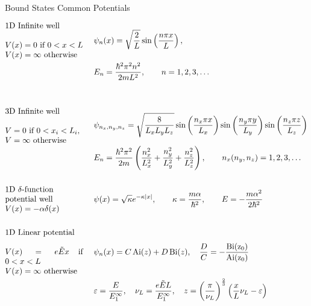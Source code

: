 \documentclass{article}[a4paper]
\begin{document}
\begin{minipage}[t]{0.5\textwidth}
  \noindent
  \begin{center}
    \large{Bound States Common Potentials}
  \end{center}
  \begin{align*}
    &\textrm{\parbox{0.28\textwidth}{1D Infinite well\\~\\ $V(x) = 0$ if $0 < x < L$\\ $V(x) = \infty$ otherwise}}    & ~&\psi_n(x) = \sqrt{\frac{2}{L}} \sin\left( \frac{n\pi x}{L} \right),\\
    && ~&E_n = \frac{\hbar^2 \pi^2 n^2}{2m L^2}, \qquad n = 1, 2, 3, \dots \\
    &&&\\
    &&&\\
    &\textrm{\parbox{0.28\textwidth}{3D Infinite well\\~\\ $V = 0$ if $0 < x_i < L_i$,\\ $V = \infty$ otherwise}} & ~&\psi_{n_x,n_y,n_z} = \sqrt{\frac{8}{L_x L_y L_z}} \sin\left( \frac{n_x\pi x}{L_x} \right) \sin\left( \frac{n_y\pi y}{L_y} \right)\sin\left( \frac{n_z\pi z}{L_z} \right)\\
    && ~&E_n = \frac{\hbar^2 \pi^2}{2m}\left( \frac{n_x^2}{L_x^2} + \frac{n_y^2}{L_y^2} + \frac{n_z^2}{L_z^2} \right), \qquad n_x(n_y, n_z) = 1, 2, 3, \dots\\
    &&&\\
    &\textrm{\parbox{0.28\textwidth}{1D $\delta$-function\\ potential well\\ $V(x) = -\alpha \delta(x)$}} & ~&\psi(x) = \sqrt{\kappa} e^{-\kappa |x|}, \qquad \kappa = \frac{m\alpha}{\hbar^2}, \qquad E = -\frac{m\alpha^2}{2\hbar^2}\\
    &&&\\
    &\textrm{\parbox{0.28\textwidth}{1D Linear potential\\~\\ $V(x) = e\tilde{E}x$ if $0 < x < L$ \\ $V(x) = \infty$ otherwise}}  & ~&\psi_n(x) = C \,\mathrm{Ai}(z) + D \,\mathrm{Bi}(z),\quad\frac{D}{C} = -\frac{\mathrm{Bi(z_0)}}{\mathrm{Ai(z_0)}}\\
    && ~&\varepsilon = \frac{E}{E_1^{\infty}}, \quad \nu_L = \frac{e\tilde{E}L}{E_1^{\infty}}, \quad z = \left(\frac{\pi}{\nu_L}\right)^{\frac{2}{3}} \left(\frac{x}{L}\nu_L - \varepsilon\right)\\

\end{align*}
\end{minipage}
\end{document}
